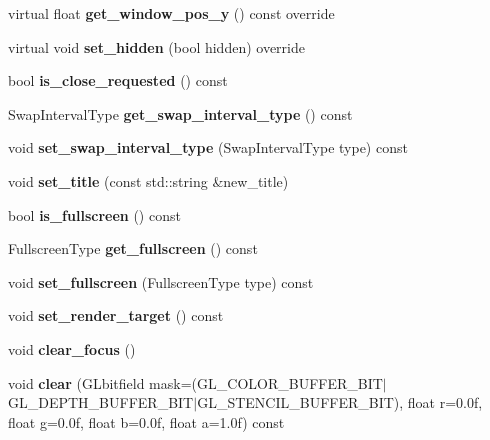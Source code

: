 \begin{DoxyCompactItemize}
virtual float {\bfseries get\+\_\+window\+\_\+pos\+\_\+y} () const override
\item 
\mbox{\label{class_window_ae70c9e2fddb5224f884291b6d8225fe4}} 
virtual void {\bfseries set\+\_\+hidden} (bool hidden) override
\item 
\mbox{\label{class_window_a95d3193d85c5f8ffed21eeef995602f7}} 
bool {\bfseries is\+\_\+close\+\_\+requested} () const
\item 
\mbox{\label{class_window_a73b7959b6435d574d5ddbb6115153724}} 
Swap\+Interval\+Type {\bfseries get\+\_\+swap\+\_\+interval\+\_\+type} () const
\item 
\mbox{\label{class_window_a86607cca316a63361a8e0546d7461496}} 
void {\bfseries set\+\_\+swap\+\_\+interval\+\_\+type} (Swap\+Interval\+Type type) const
\item 
\mbox{\label{class_window_a56c2030999233ae438cb86229bbf1fa8}} 
void {\bfseries set\+\_\+title} (const std\+::string \&new\+\_\+title)
\item 
\mbox{\label{class_window_a2b9672924d8048d74098deeb4202dc76}} 
bool {\bfseries is\+\_\+fullscreen} () const
\item 
\mbox{\label{class_window_aba76e9ee7a1fc05a26340154244bd967}} 
Fullscreen\+Type {\bfseries get\+\_\+fullscreen} () const
\item 
\mbox{\label{class_window_ae2ed6e396cf3dd2eb2636951192949cf}} 
void {\bfseries set\+\_\+fullscreen} (Fullscreen\+Type type) const
\item 
\mbox{\label{class_window_a4d69ff4818898cd74241214183f404f9}} 
void {\bfseries set\+\_\+render\+\_\+target} () const
\item 
\mbox{\label{class_window_a0df947eae50ea0565b4b5d826b94a394}} 
void {\bfseries clear\+\_\+focus} ()
\item 
\mbox{\label{class_window_a8ad58be4ce5aec15ad590ce151d4776a}} 
void {\bfseries clear} (G\+Lbitfield mask=(G\+L\+\_\+\+C\+O\+L\+O\+R\+\_\+\+B\+U\+F\+F\+E\+R\+\_\+\+B\+IT$\vert$G\+L\+\_\+\+D\+E\+P\+T\+H\+\_\+\+B\+U\+F\+F\+E\+R\+\_\+\+B\+IT$\vert$G\+L\+\_\+\+S\+T\+E\+N\+C\+I\+L\+\_\+\+B\+U\+F\+F\+E\+R\+\_\+\+B\+IT), float r=0.\+0f, float g=0.\+0f, float b=0.\+0f, float a=1.\+0f) const

\end{DoxyCompactItemize}
